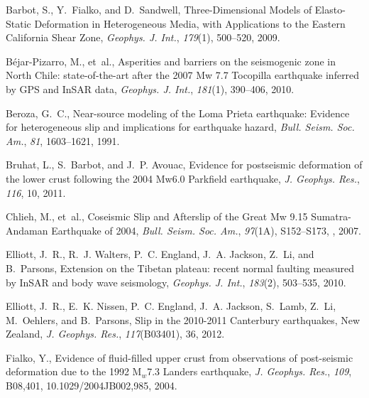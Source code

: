 \documentclass[10pt]{article}
\begin{document}
\begin{thebibliography}{38}
Barbot, S., Y.~Fialko, and D.~Sandwell, {Three-Dimensional Models of
  Elasto-Static Deformation in Heterogeneous Media, with Applications to the
  Eastern California Shear Zone}, \textit{Geophys. J. Int.}, \textit{179}(1),
  500--520, 2009{}.

B\'{e}jar-Pizarro, M., et~al., {Asperities and barriers on the seismogenic zone
  in North Chile: state-of-the-art after the 2007 Mw 7.7 Tocopilla earthquake
  inferred by GPS and InSAR data}, \textit{Geophys. J. Int.}, \textit{181}(1),
  390--406, 2010.

Beroza, G.~C., {Near-source modeling of the Loma Prieta earthquake: Evidence
  for heterogeneous slip and implications for earthquake hazard}, \textit{Bull.
  Seism. Soc. Am.}, \textit{81}, 1603--1621, 1991.

Bruhat, L., S.~Barbot, and J.~P. Avouac, {Evidence for postseismic deformation
  of the lower crust following the 2004 Mw6.0 Parkfield earthquake}, \textit{J.
  Geophys. Res.}, \textit{116}, 10, 2011.

Chlieh, M., et~al., {Coseismic Slip and Afterslip of the Great Mw 9.15
  Sumatra-Andaman Earthquake of 2004}, \textit{Bull. Seism. Soc. Am.},
  \textit{97}(1A), S152--S173, , 2007.

Elliott, J.~R., R.~J. Walters, P.~C. England, J.~A. Jackson, Z.~Li, and
  B.~Parsons, {Extension on the Tibetan plateau: recent normal faulting
  measured by InSAR and body wave seismology}, \textit{Geophys. J. Int.},
  \textit{183}(2), 503--535, 2010.

Elliott, J.~R., E.~K. Nissen, P.~C. England, J.~A. Jackson, S.~Lamb, Z.~Li,
  M.~Oehlers, and B.~Parsons, {Slip in the 2010-2011 Canterbury earthquakes,
  New Zealand}, \textit{J. Geophys. Res.}, \textit{117}(B03401), 36, 2012.

Fialko, Y., {Evidence of fluid-filled upper crust from observations of
  post-seismic deformation due to the 1992 M$_w$7.3 Landers earthquake},
  \textit{J. Geophys. Res.}, \textit{109}, B08,401, 10.1029/2004JB002,985,
  2004.


\end{thebibliography}
\end{document}
